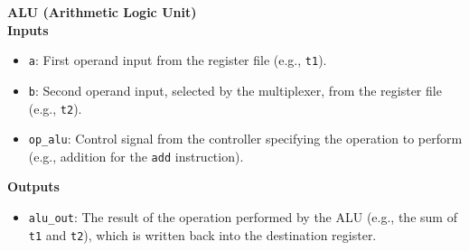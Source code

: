 \hfill
\vline
\hfill
\begin{minipage}[t]{0.3\textwidth}
    \footnotesize
    \textbf{ALU (Arithmetic Logic Unit)} \\ \vspace*{5px}
    \textbf{Inputs}
    \begin{itemize}
        \item \texttt{a}: First operand input from the register file (e.g., \texttt{t1}).
        \item \texttt{b}: Second operand input, selected by the multiplexer, from the register file (e.g., \texttt{t2}).
        \item \texttt{op\_alu}: Control signal from the controller specifying the operation to perform (e.g., addition for the \texttt{add} instruction).
    \end{itemize}
    \textbf{Outputs}
    \begin{itemize}
        \item \texttt{alu\_out}: The result of the operation performed by the ALU (e.g., the sum of \texttt{t1} and \texttt{t2}), which is written back into the destination register.
    \end{itemize}
\end{minipage}

